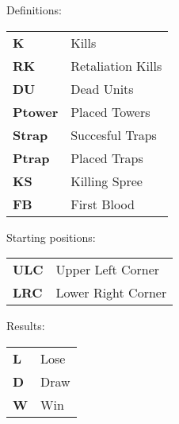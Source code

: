 \documentclass[a4paper,12pt]{article}
\begin{document}
\begin{minipage}[b]{0.45\linewidth}
  Definitions:\\\vspace*{.5em}
  \begin{tabular}[b]{l l}
    \textbf{K}  & Kills \\
    \textbf{RK} & Retaliation Kills \\
    \textbf{DU} & Dead Units \\
    \textbf{Ptower} & Placed Towers \\
    \textbf{Strap} & Succesful Traps \\
    \textbf{Ptrap} & Placed Traps \\
    \textbf{KS} & Killing Spree \\
    \textbf{FB} & First Blood
  \end{tabular}
\end{minipage}
\hspace{0.5cm}
\begin{minipage}[b]{0.45\linewidth}
  Starting positions:\\\vspace*{.5em}
  \begin{tabular}[b] {l l}
    \textbf{ULC} & Upper Left Corner \\
    \textbf{LRC} & Lower Right Corner
  \end{tabular}
  \vspace*{1em} Results:\\\vspace*{.5em}
  \begin{tabular}[b]{l l}
    \textbf{L} & Lose \\
    \textbf{D} & Draw \\
    \textbf{W} & Win
  \end{tabular}
\end{minipage}
\end{document}
